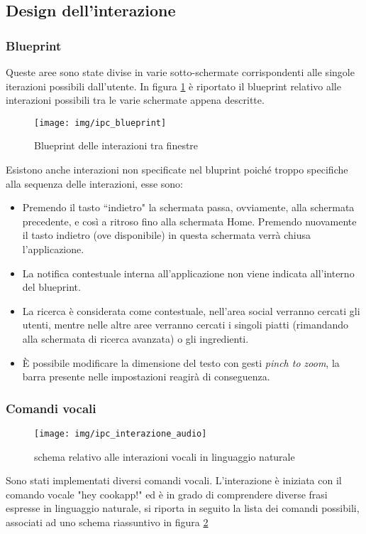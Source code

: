 \subsection{Design dell'interazione}

\subsubsection{Blueprint}
Queste aree sono state divise in varie sotto-schermate corrispondenti alle
singole iterazioni possibili dall'utente.  In figura \ref{fig:blueprint}
è riportato il blueprint relativo alle interazioni possibili tra le varie schermate appena descritte.
\begin{figure}[H]
	\centering
	\caption{Blueprint delle interazioni tra finestre}
	\texttt{[image: img/ipc\_blueprint]}
	\label{fig:blueprint}
\end{figure}
Esistono anche interazioni non specificate nel bluprint poiché troppo specifiche
alla sequenza delle interazioni, esse sono:
\begin{itemize}
	\item Premendo il tasto ``indietro" la schermata passa, ovviamente, alla
	schermata precedente, e così a ritroso fino alla schermata Home.
	Premendo nuovamente il tasto indietro (ove disponibile) in questa
	schermata verrà chiusa l'applicazione.
	\item La notifica contestuale interna all'applicazione non viene
	indicata all'interno del blueprint.
	\item La ricerca è considerata come contestuale, nell'area social
	verranno cercati gli utenti, mentre nelle altre aree verranno cercati i
	singoli piatti (rimandando alla schermata di ricerca avanzata)
	o gli ingredienti.
	\item È possibile modificare la dimensione del testo con gesti \emph{pinch to
	zoom}, la barra presente nelle impostazioni reagirà di conseguenza.
\end{itemize}

\subsubsection{Comandi vocali}
\begin{figure}[H]
	\texttt{[image: img/ipc\_interazione\_audio]}
	\caption{schema relativo alle interazioni vocali in linguaggio naturale}
	\label{fig:ipcvocali}
\end{figure}
Sono stati implementati diversi comandi vocali.  L'interazione è iniziata
con il comando vocale "hey cookapp!" ed è in grado di comprendere diverse frasi
espresse in linguaggio naturale, si riporta in seguito la lista dei comandi
possibili, associati ad uno schema riassuntivo in figura \ref{fig:ipcvocali}


